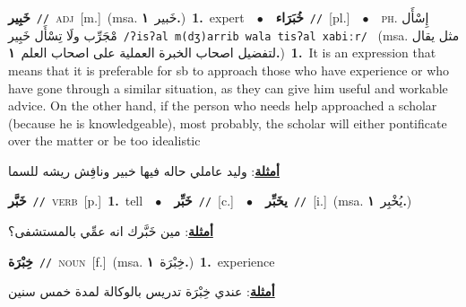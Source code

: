 \documentclass[10pt,a4paper,twoside]{article} %
\begin{document}
\begin{multicols}{2}
{\setlength\topsep{0pt}\textbf{\foreignlanguage{arabic}{خَبِير}}\ {\color{gray}\texttt{//}\color{black}}\ \textsc{adj}\ [m.]\ \color{gray}(msa. \foreignlanguage{arabic}{خَبير}~\foreignlanguage{arabic}{\textbf{١.}})\color{black}\ \textbf{1.}~expert\ \ $\bullet$\ \ \setlength\topsep{0pt}\textbf{\foreignlanguage{arabic}{خُبَرَاء}}\ {\color{gray}\texttt{//}\color{black}}\ [pl.]\ \ $\bullet$\ \ \textsc{ph.} \color{gray} \foreignlanguage{arabic}{إِسْأَل مْجَرِّب ولَا تِسْأَل خَبِير}\color{black}\ {\color{gray}\texttt{/{\sffamily ʔisʔal m(dʒ)arrib wala tisʔal xabiːr}/}\color{black}}\ \color{gray} (msa. \foreignlanguage{arabic}{مثل يقال لتفضيل اصحاب الخبرة العملية على اصحاب العلم}~\foreignlanguage{arabic}{\textbf{١.}})\color{black}\ \textbf{1.}~It is an expression that means that it is preferable for sb to approach those who have experience or who have gone through a similar situation, as they can give him useful and workable advice. On the other hand, if the person who needs help approached a scholar (because he is knowledgeable), most probably, the scholar will either pontificate over the matter or be too idealistic\  \begin{flushright}\color{gray}\foreignlanguage{arabic}{\textbf{\underline{\foreignlanguage{arabic}{أمثلة}}}: وليد عاملي حاله فيها خبير ونافِش ريشه للسما}\end{flushright}\color{black}} \vspace{2mm}

{\setlength\topsep{0pt}\textbf{\foreignlanguage{arabic}{خَبَّر}}\ {\color{gray}\texttt{//}\color{black}}\ \textsc{verb}\ [p.]\ \textbf{1.}~tell\ \ $\bullet$\ \ \setlength\topsep{0pt}\textbf{\foreignlanguage{arabic}{خَبِّر}}\ {\color{gray}\texttt{//}\color{black}}\ [c.]\ \ $\bullet$\ \ \setlength\topsep{0pt}\textbf{\foreignlanguage{arabic}{يخَبِّر}}\ {\color{gray}\texttt{//}\color{black}}\ [i.]\ \color{gray}(msa. \foreignlanguage{arabic}{يُخْبِر}~\foreignlanguage{arabic}{\textbf{١.}})\color{black}\  \begin{flushright}\color{gray}\foreignlanguage{arabic}{\textbf{\underline{\foreignlanguage{arabic}{أمثلة}}}: مين خَبَّرك انه عمِّي بالمستشفى؟}\end{flushright}\color{black}} \vspace{2mm}

{\setlength\topsep{0pt}\textbf{\foreignlanguage{arabic}{خِبْرَة}}\ {\color{gray}\texttt{//}\color{black}}\ \textsc{noun}\ [f.]\ \color{gray}(msa. \foreignlanguage{arabic}{خِبْرَة}~\foreignlanguage{arabic}{\textbf{١.}})\color{black}\ \textbf{1.}~experience\  \begin{flushright}\color{gray}\foreignlanguage{arabic}{\textbf{\underline{\foreignlanguage{arabic}{أمثلة}}}: عندي خِبْرَة تدريس بالوكالة لمدة خمس سنين}\end{flushright}\color{black}} \vspace{2mm}


\end{multicols}
\end{document}
